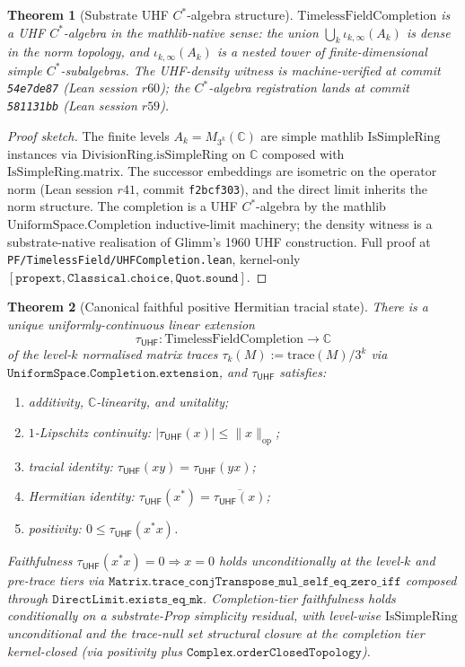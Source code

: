 \documentclass[11pt,a4paper]{amsart}
\theoremstyle{plain}
\newtheorem{theorem}{Theorem}[section]
\theoremstyle{definition}
\begin{document}
\begin{theorem}[Substrate UHF $C^*$-algebra structure]\label{thm:uhf-structure}
$\mathrm{TimelessFieldCompletion}$ is a UHF $C^*$-algebra in the mathlib-native sense: the union $\bigcup_{k} \iota_{k,\infty}(A_{k})$ is dense in the norm topology, and $\iota_{k,\infty}(A_{k})$ is a nested tower of finite-dimensional simple $C^*$-subalgebras. The UHF-density witness is machine-verified at commit \texttt{54e7de87} (Lean session $r60$); the $C^*$-algebra registration lands at commit \texttt{581131bb} (Lean session $r59$).
\end{theorem}

\begin{proof}[Proof sketch]
The finite levels $A_{k} = M_{3^{k}}(\mathbb{C})$ are simple mathlib $\mathrm{IsSimpleRing}$ instances via $\mathrm{DivisionRing.isSimpleRing}$ on $\mathbb{C}$ composed with $\mathrm{IsSimpleRing.matrix}$. The successor embeddings are isometric on the operator norm (Lean session $r41$, commit \texttt{f2bcf303}), and the direct limit inherits the norm structure. The completion is a UHF $C^*$-algebra by the mathlib $\mathrm{UniformSpace.Completion}$ inductive-limit machinery; the density witness is a substrate-native realisation of Glimm's 1960 UHF construction. Full proof at \texttt{PF/TimelessField/UHFCompletion.lean}, kernel-only $[\texttt{propext}, \texttt{Classical.choice}, \texttt{Quot.sound}]$.
\end{proof}

\begin{theorem}[Canonical faithful positive Hermitian tracial state]\label{thm:tau-uhf}
There is a unique uniformly-continuous linear extension
\[
\tau_{\textsf{UHF}} \colon \mathrm{TimelessFieldCompletion} \to \mathbb{C}
\]
of the level-$k$ normalised matrix traces $\tau_{k}(M) := \mathrm{trace}(M) / 3^{k}$ via $\texttt{UniformSpace.Completion.extension}$, and $\tau_{\textsf{UHF}}$ satisfies:
\begin{enumerate}[itemsep=1pt,leftmargin=1.5em]
\item[(i)] additivity, $\mathbb{C}$-linearity, and unitality;
\item[(ii)] $1$-Lipschitz continuity: $|\tau_{\textsf{UHF}}(x)| \le \|x\|_{\mathrm{op}}$;
\item[(iii)] tracial identity: $\tau_{\textsf{UHF}}(xy) = \tau_{\textsf{UHF}}(yx)$;
\item[(iv)] Hermitian identity: $\tau_{\textsf{UHF}}(x^{*}) = \overline{\tau_{\textsf{UHF}}(x)}$;
\item[(v)] positivity: $0 \le \tau_{\textsf{UHF}}(x^{*}x)$.
\end{enumerate}
Faithfulness $\tau_{\textsf{UHF}}(x^{*}x) = 0 \Rightarrow x = 0$ holds unconditionally at the level-$k$ and pre-trace tiers via $\texttt{Matrix.trace\_conjTranspose\_mul\_self\_eq\_zero\_iff}$ composed through $\texttt{DirectLimit.exists\_eq\_mk}$. Completion-tier faithfulness holds conditionally on a substrate-Prop simplicity residual, with level-wise $\mathrm{IsSimpleRing}$ unconditional and the trace-null set structural closure at the completion tier kernel-closed (via positivity plus $\texttt{Complex.orderClosedTopology}$).
\end{theorem}
\end{document}

